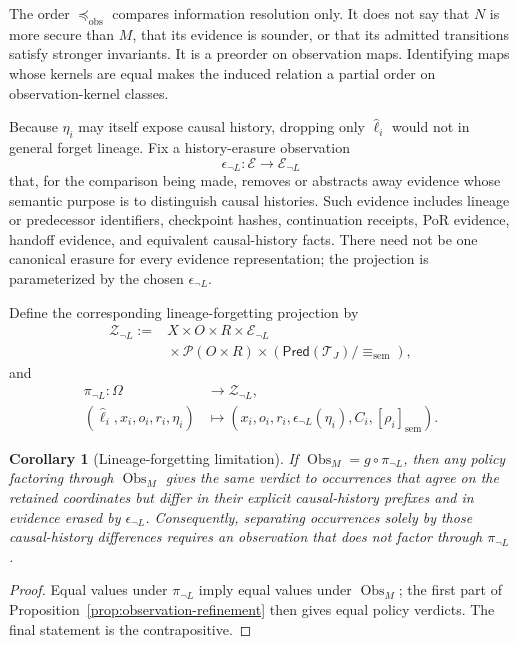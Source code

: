 \documentclass[10pt,twocolumn]{article}
\newcommand{\Transitions}{\mathcal{T}}
\newcommand{\Pred}{\mathsf{Pred}}
\newtheorem{corollary}{Corollary}
\begin{document}
The order \(\preceq_{\mathrm{obs}}\) compares information resolution only. It
does not say that \(N\) is more secure than \(M\), that its evidence is sounder,
or that its admitted transitions satisfy stronger invariants.
It is a preorder on observation maps. Identifying maps whose kernels are equal
makes the induced relation a partial order on observation-kernel classes.

Because \(\eta_i\) may itself expose causal history, dropping only
\(\widehat{\ell}_i\) would not in general forget lineage. Fix a
history-erasure observation
\[
\epsilon_{\neg L}:\mathcal E\longrightarrow\mathcal E_{\neg L}
\]
that, for the comparison being made, removes or abstracts away evidence whose
semantic purpose is to distinguish causal histories. Such evidence includes
lineage or predecessor identifiers, checkpoint hashes, continuation receipts,
PoR evidence, handoff evidence, and equivalent causal-history facts. There need
not be one canonical erasure for every evidence representation; the projection
is parameterized by the chosen \(\epsilon_{\neg L}\).

Define the corresponding lineage-forgetting projection by
\[
\begin{aligned}
\mathcal Z_{\neg L}:={}&
X\times O\times R\times\mathcal E_{\neg L}\\
&{}\times\mathcal P(O\times R)
\times(\Pred(\Transitions_J)/{\equiv_{\mathrm{sem}}}),
\end{aligned}
\]
and
\[
\begin{aligned}
\pi_{\neg L}:\Omega&\longrightarrow\mathcal Z_{\neg L},\\
(\widehat{\ell}_i,x_i,o_i,r_i,\eta_i)
&\longmapsto
(x_i,o_i,r_i,\epsilon_{\neg L}(\eta_i),
C_i,[\rho_i]_{\mathrm{sem}}).
\end{aligned}
\]

\begin{corollary}[Lineage-forgetting limitation]
\label{cor:lineage-forgetting}
If \(\operatorname{Obs}_M=g\circ\pi_{\neg L}\), then any policy factoring
through \(\operatorname{Obs}_M\) gives the same verdict to occurrences that
agree on the retained coordinates but differ in their explicit causal-history
prefixes and in evidence erased by \(\epsilon_{\neg L}\). Consequently,
separating occurrences solely by those causal-history differences requires an
observation that does not factor through \(\pi_{\neg L}\).
\end{corollary}

\begin{proof}
Equal values under \(\pi_{\neg L}\) imply equal values under
\(\operatorname{Obs}_M\); the first part of
Proposition~\ref{prop:observation-refinement} then gives equal policy verdicts.
The final statement is the contrapositive.
\end{proof}
\end{document}
